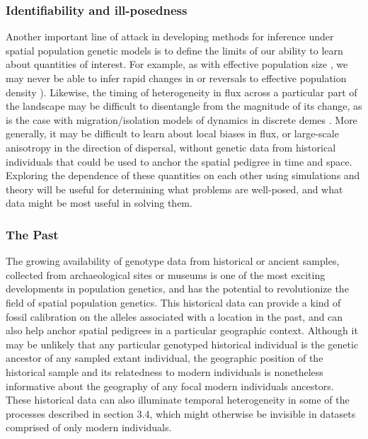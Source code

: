 \documentclass{ar-1col}
\newcommand{\todo}[1]{{\textbf{\color{red}{#1}}}}
\begin{document}
\subsubsection{Identifiability and ill-posedness}
\todo{keep?}
Another important line of attack in developing methods for inference 
under spatial population genetic models 
is to define the limits of our ability to learn about 
quantities of interest.
For example, 
as with effective population size \citep{Myers2008},
we may never be able to infer rapid changes in 
or reversals to effective population density
\citep[although see also][]{BhaskarSong2014descartes}).
Likewise, 
the timing of heterogeneity in flux across a particular part of the landscape 
may be difficult to disentangle from the magnitude of its change, 
as is the case with migration/isolation models 
of dynamics in discrete demes \citep{sousa2011nonidentifiability}.
More generally,
it may be difficult to learn about local biases in flux, 
or large-scale anisotropy in the direction of dispersal,
without genetic data from historical individuals 
that could be used to anchor the spatial pedigree 
in time and space.
Exploring the dependence of these quantities on each other 
using simulations and theory 
will be useful for determining what problems are well-posed, 
and what data might be most useful in solving them.


\subsubsection{The Past} 
The growing availability of genotype data from historical or ancient samples, 
collected from archaeological sites or museums 
is one of the most exciting developments in population genetics, 
and has the potential to revolutionize the field of spatial population genetics.
This historical data can provide a kind of fossil calibration on 
the alleles associated with a location in the past, 
and can also help anchor spatial pedigrees in a particular geographic context.
Although it may be unlikely that any particular genotyped historical individual 
is the genetic ancestor of any sampled extant individual, 
the geographic position of the historical sample and its 
relatedness to modern individuals is nonetheless informative 
about the geography of any focal modern individuals ancestors.
These historical data can also illuminate temporal heterogeneity 
in some of the processes described in section 3.4, 
which might otherwise be invisible in datasets comprised of only modern individuals.
\end{document}
